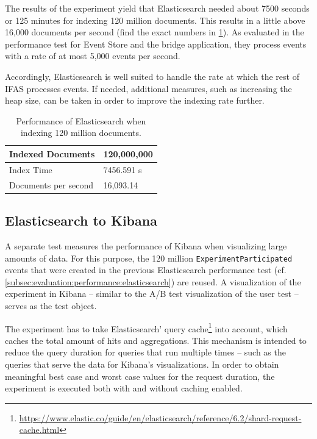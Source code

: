 The results of the experiment yield that Elasticsearch needed about 7500 seconds or 125 minutes for indexing 120 million documents.
This results in a little above 16,000 documents per second (find the exact numbers in \cref{table:elasticsearch-performance}).
As evaluated in the performance test for Event Store and the bridge application, they process events with a rate of at most 5,000 events per second.

Accordingly, Elasticsearch is well suited to handle the rate at which the rest of \ac{IFAS} processes events.
If needed, additional measures, such as increasing the heap size, can be taken in order to improve the indexing rate further.

\begin{table}
\caption{Performance of Elasticsearch when indexing 120 million documents.}
\label{table:elasticsearch-performance}
\centering
\begin{tabular}{l|l}
Indexed Documents & 120,000,000 \\ \hline
Index Time & 7456.591 s \\ \hline
Documents per second & 16,093.14
\end{tabular}
\end{table}

\subsection{Elasticsearch to Kibana}
\label{subsec:evaluation:performance:kibana}

A separate test measures the performance of Kibana when visualizing large amounts of data.
For this purpose, the 120 million \texttt{ExperimentParticipated} events that were created in the previous Elasticsearch performance test (cf. \cref{subsec:evaluation:performance:elasticsearch}) are reused.
A visualization of the experiment in Kibana -- similar to the A/B test visualization of the user test -- serves as the test object.


The experiment has to take Elasticsearch' query cache\footnote{\url{https://www.elastic.co/guide/en/elasticsearch/reference/6.2/shard-request-cache.html}} into account, which caches the total amount of hits and aggregations.
This mechanism is intended to reduce the query duration for queries that run multiple times -- such as the queries that serve the data for Kibana's visualizations.
In order to obtain meaningful best case and worst case values for the request duration, the experiment is executed both with and without caching enabled.

